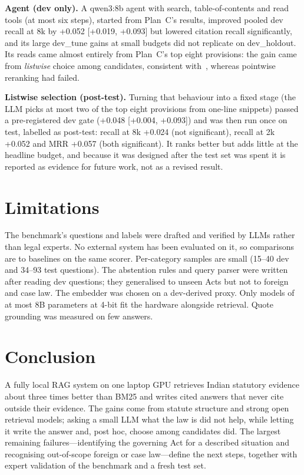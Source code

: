 \documentclass[conference]{IEEEtran}
\begin{document}
\textbf{Agent (dev only).} A qwen3:8b agent with search, table-of-contents and read tools (at most six steps),
started from Plan~C's results, improved pooled dev recall at 8k by +0.052 [+0.019, +0.093] but lowered citation
recall significantly, and its large dev\_tune gains at small budgets did not replicate on dev\_holdout. Its reads
came almost entirely from Plan~C's top eight provisions: the gain came from \emph{listwise} choice among
candidates, consistent with~\cite{sun2023rankgpt}, whereas pointwise reranking had failed.

\textbf{Listwise selection (post-test).} Turning that behaviour into a fixed stage (the LLM picks at most two of
the top eight provisions from one-line snippets) passed a pre-registered dev gate (+0.048 [+0.004, +0.093]) and
was then run once on test, labelled as post-test: recall at 8k +0.024 (not significant), recall at 2k +0.052 and
MRR +0.057 (both significant). It ranks better but adds little at the headline budget, and because it was designed
after the test set was spent it is reported as evidence for future work, not as a revised result.

\section{Limitations}

The benchmark's questions and labels were drafted and verified by LLMs rather than legal experts. No external
system has been evaluated on it, so comparisons are to baselines on the same scorer. Per-category samples are
small (15--40 dev and 34--93 test questions). The abstention rules and query parser were written after reading
dev questions; they generalised to unseen Acts but not to foreign and case law. The embedder was chosen on a
dev-derived proxy. Only models of at most 8B parameters at 4-bit fit the hardware alongside retrieval. Quote
grounding was measured on few answers.

\section{Conclusion}

A fully local RAG system on one laptop GPU retrieves Indian statutory evidence about three times better than
BM25 and writes cited answers that never cite outside their evidence. The gains come from statute structure and
strong open retrieval models; asking a small LLM what the law is did not help, while letting it write the answer
and, post hoc, choose among candidates did. The largest remaining failures---identifying the governing Act for a
described situation and recognising out-of-scope foreign or case law---define the next steps, together with
expert validation of the benchmark and a fresh test set.



\end{document}
